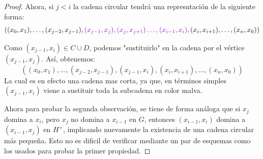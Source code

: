 \begin{proof}
Ahora, si $j<i$ la cadena circular tendr\'a una represntaci\'on de la siguiente forma:
$$( (x_0,x_1),\dots, (x_{j-2},x_{j-1}), {\color{malva}(x_{j-1},x_j),(x_j,x_{j+1}) \dots, (x_{i-1},x_{i})},(x_{i},x_{i+1}), \dots , (x_n,x_0))$$

Como $(x_{j-1},x_i) \in C\cup D$, podemos "sustituirlo" en la cadena por el v\'ertice $(x_{j-1},x_{j})$. Así, obtenemos:
$$( (x_0,x_1),\dots, (x_{j-2},x_{j-1}), (x_{j-1},x_i),(x_{i},x_{i+1}), \dots , (x_n,x_0))$$
La cual es en efecto una cadena mas corta, ya que, en t\'erminos simples $(x_{j-1},x_i)$ viene a sustituir toda la subcadena en color malva.

Ahora para probar la segunda observaci\'on, se tiene de forma an\'aloga que si $x_j$ domina a $x_i$, pero $x_j$ no domina a $x_{i-1}$ en $G$, entonces $(x_{i-1}, x_i)$ domina a $(x_{i-1}, x_j)$ en $H^+$, implicando nuevamente la existencia de una cadena circular m\'as pequeña. Esto no es dificil de verificar mediante un par de esquemas como los usados para probar la primer propiedad.


\end{proof}
